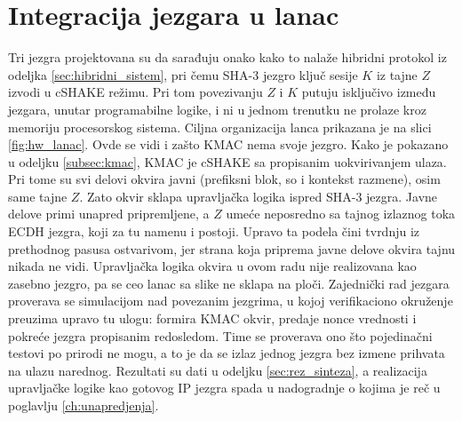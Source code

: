 \section{Integracija jezgara u lanac}
\label{sec:hw_integracija}

Tri jezgra projektovana su da sarađuju onako kako to nalaže hibridni protokol iz odeljka \ref{sec:hibridni_sistem}, pri čemu SHA-3 jezgro ključ sesije $K$ iz tajne $Z$ izvodi u cSHAKE režimu. Pri tom povezivanju $Z$ i $K$ putuju isključivo između jezgara, unutar programabilne logike, i ni u jednom trenutku ne prolaze kroz memoriju procesorskog sistema. Ciljna organizacija lanca prikazana je na slici \ref{fig:hw_lanac}.
\smallbreak
Ovde se vidi i zašto KMAC nema svoje jezgro. Kako je pokazano u odeljku \ref{subsec:kmac}, KMAC je cSHAKE sa propisanim uokvirivanjem ulaza. Pri tome su svi delovi okvira javni (prefiksni blok, so i kontekst razmene), osim same tajne $Z$. Zato okvir sklapa upravljačka logika ispred SHA-3 jezgra. Javne delove primi unapred pripremljene, a $Z$ umeće neposredno sa tajnog izlaznog toka ECDH jezgra, koji za tu namenu i postoji. Upravo ta podela čini tvrdnju iz prethodnog pasusa ostvarivom, jer strana koja priprema javne delove okvira tajnu nikada ne vidi.
\smallbreak
Upravljačka logika okvira u ovom radu nije realizovana kao zasebno jezgro, pa se ceo lanac sa slike ne sklapa na ploči. Zajednički rad jezgara proverava se simulacijom nad povezanim jezgrima, u kojoj verifikaciono okruženje preuzima upravo tu ulogu: formira KMAC okvir, predaje nonce vrednosti i pokreće jezgra propisanim redosledom. Time se proverava ono što pojedinačni testovi po prirodi ne mogu, a to je da se izlaz jednog jezgra bez izmene prihvata na ulazu narednog. Rezultati su dati u odeljku \ref{sec:rez_sinteza}, a realizacija upravljačke logike kao gotovog IP jezgra spada u nadogradnje o kojima je reč u poglavlju \ref{ch:unapredjenja}.


